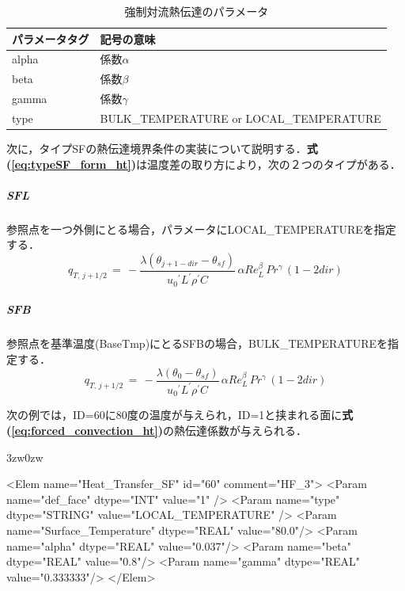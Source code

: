 \begin{table}[htdp]
\caption{強制対流熱伝達のパラメータ}
\begin{center}
\small
\begin{tabular}{ll}\toprule
パラメータタグ & 記号の意味\\ \midrule
alpha & 係数$\alpha$\\
beta & 係数$\beta$\\
gamma & 係数$\gamma$\\
type & BULK\_TEMPERATURE or LOCAL\_TEMPERATURE\\ \bottomrule
\end{tabular}
\end{center}
\label{tbl:heat transfer type SF para}
\end{table}

次に，タイプSFの熱伝達境界条件の実装について説明する．\textbf{式(\ref{eq:typeSF_form_ht})}は温度差の取り方により，次の２つのタイプがある．

\subparagraph{SFL}
参照点を一つ外側にとる場合，パラメータにLOCAL\_TEMPERATUREを指定する．
\begin{equation}
q_{T,\,j+1/2} \,=\, - \frac{\lambda \left( \theta_{j+1-dir} -\theta_{sf} \right)}{{u_\mathit{0}}^\prime L^\prime \rho^\prime C} \, \alpha Re_L^\beta \, Pr^\gamma \,\left( 1-2{dir} \right)
\label{eq:typeSF_heat_flux_ND}
\end{equation}

\subparagraph{SFB}
参照点を基準温度(BaseTmp)にとるSFBの場合，BULK\_TEMPERATUREを指定する．
\begin{equation}
q_{T,\,j+1/2} \,=\, - \frac{\lambda \left( \theta_0 -\theta_{sf} \right)}{{u_\mathit{0}}^\prime L^\prime \rho^\prime C} \, \alpha Re_L^\beta \, Pr^\gamma \,\left( 1-2{dir} \right)
\label{eq:typeSF_heat_flux_ND_2}
\end{equation}


次の例では，ID=60に80度の温度が与えられ，ID=1と挟まれる面に\textbf{式(\ref{eq:forced_convection_ht})}の熱伝達係数が与えられる．

\begin{indentation}{3zw}{0zw}
\small
\begin{program}
<Elem name="Heat_Transfer_SF" id="60"  comment="HF_3">
  <Param name="def_face"    dtype="INT"    value="1" />
  <Param name="type"    dtype="STRING"    value="LOCAL_TEMPERATURE" />
  <Param name="Surface_Temperature" dtype="REAL" value="80.0"/>
  <Param name="alpha" dtype="REAL" value="0.037"/>
  <Param name="beta"  dtype="REAL" value="0.8"/>
  <Param name="gamma" dtype="REAL" value="0.333333"/>
</Elem>
\end{program}
\end{indentation}


